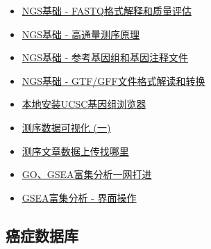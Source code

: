 \documentclass[]{article}
\providecommand{\tightlist}{%
  \setlength{\itemsep}{0pt}\setlength{\parskip}{0pt}}
\numberwithin{figure}{section}
\numberwithin{table}{section}
\theoremstyle{definition}
\theoremstyle{definition}
\theoremstyle{definition}
\theoremstyle{remark}
\begin{document}
\begin{itemize}
\tightlist
\item
  \href{http://mp.weixin.qq.com/s?__biz=MzI5MTcwNjA4NQ==\&mid=2247484047\&idx=1\&sn=3e2a79d9f56040a57ac2e16cf1923b54\&chksm=ec0dc705db7a4e133e6e91de9ac11a6c0690f03d7b3b760b358e9b0d1a2d57974599419d9fff\#rd}{NGS基础
  - FASTQ格式解释和质量评估}
\item
  \href{http://mp.weixin.qq.com/s?__biz=MzI5MTcwNjA4NQ==\&mid=2247484034\&idx=1\&sn=e7680ee935f8603214227b37eeb2c567\&chksm=ec0dc708db7a4e1eca4e38845381f328c49c84a90ad6580c3ba3761511772636e5ec0f185931\#rd}{NGS基础
  - 高通量测序原理}
\item
  \href{http://mp.weixin.qq.com/s?__biz=MzI5MTcwNjA4NQ==\&mid=2247484148\&idx=1\&sn=525233898721a9c3ebdf275babf14944\&chksm=ec0dc77edb7a4e686440e0cbe5fbf39f554c4183dc30e7870ab7584e285f4e018dd94b680f79\#rd}{NGS基础
  - 参考基因组和基因注释文件}
\item
  \href{http://mp.weixin.qq.com/s?__biz=MzI5MTcwNjA4NQ==\&mid=2247484166\&idx=1\&sn=417e155672bd718def86003b16bf0078\&chksm=ec0dc68cdb7a4f9a6bcb62c18797a69040173e2b0af20f1cf87d3e0d75e3adee03c7ff524dc5\#rd}{NGS基础
  - GTF/GFF文件格式解读和转换}
\item
  \href{http://mp.weixin.qq.com/s?__biz=MzI5MTcwNjA4NQ==\&mid=2247484167\&idx=1\&sn=ef9699899164d23013d92b61331c6562\&chksm=ec0dc68ddb7a4f9bfb83b9942196622f8b8f52b041d3f4a12786e6464752fbeaf64c9a640e39\#rd}{本地安装UCSC基因组浏览器}
\item
  \href{http://mp.weixin.qq.com/s?__biz=MzI5MTcwNjA4NQ==\&mid=2247483946\&idx=1\&sn=3f95769229f28a91ed8bf5889e2181be\&chksm=ec0dc7a0db7a4eb64d08c7799cfe698a1662e6d0d935a8b91c6c969aae86900df4decc469a0d\#rd}{测序数据可视化
  (一)}
\item
  \href{http://mp.weixin.qq.com/s?__biz=MzI5MTcwNjA4NQ==\&mid=2247483843\&idx=1\&sn=43770d21f6c2da2393c31cd55fdbe31e\&chksm=ec0dc449db7a4d5f723842286bf7feab7830eba5d9778d351569810a069e5ace76040f94a6bd\#rd}{测序文章数据上传找哪里}
\item
  \href{http://mp.weixin.qq.com/s/d1KCETQZ88yaOLGwAtpWYg}{GO、GSEA富集分析一网打进}
\item
  \href{http://mp.weixin.qq.com/s/3Nd3urhfRGkw-F0LGZrlZQ}{GSEA富集分析 -
  界面操作}
\end{itemize}

\subsection{癌症数据库}
\end{document}
